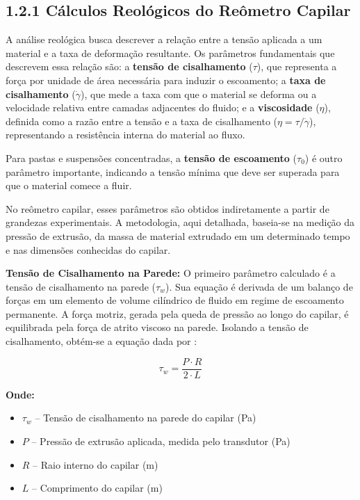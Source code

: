 \documentclass[a4paper,12pt]{article}
\begin{document}
\subsection*{1.2.1 Cálculos Reológicos do Reômetro Capilar}
A análise reológica busca descrever a relação entre a tensão aplicada a um material e a taxa de deformação resultante. Os parâmetros fundamentais que descrevem essa relação são: a \textbf{tensão de cisalhamento} ($\tau$), que representa a força por unidade de área necessária para induzir o escoamento; a \textbf{taxa de cisalhamento} ($\dot{\gamma}$), que mede a taxa com que o material se deforma ou a velocidade relativa entre camadas adjacentes do fluido; e a \textbf{viscosidade} ($\eta$), definida como a razão entre a tensão e a taxa de cisalhamento ($\eta = \tau / \dot{\gamma}$), representando a resistência interna do material ao fluxo.

Para pastas e suspensões concentradas, a \textbf{tensão de escoamento} ($\tau_0$) é outro parâmetro importante, indicando a tensão mínima que deve ser superada para que o material comece a fluir.

No reômetro capilar, esses parâmetros são obtidos indiretamente a partir de gran\-de\-zas experimentais. A metodologia, aqui detalhada, baseia-se na medição da pressão de extrusão, da massa de material extrudado em um determinado tempo e nas dimensões conhecidas do capilar.

\textbf{Tensão de Cisalhamento na Parede:} O primeiro parâmetro calculado é a tensão de cisalhamento na parede ($\tau_w$). Sua equação é derivada de um balanço de forças em um elemento de volume cilíndrico de fluido em regime de escoamento permanente. A força motriz, gerada pela queda de pressão ao longo do capilar, é equilibrada pela força de atrito viscoso na parede. Isolando a tensão de cisalhamento, obtém-se a equação dada por \cite{barnes1989}:

\begin{equation}
    \tau_w = \frac{P \cdot R}{2 \cdot L}
\end{equation}

\textbf{Onde:}
\begin{itemize}[leftmargin=1.5em]
  \item $\tau_w$ -- Tensão de cisalhamento na parede do capilar (\si{Pa})
  \item $P$ -- Pressão de extrusão aplicada, medida pelo transdutor (\si{Pa})
  \item $R$ -- Raio interno do capilar (\si{m})
  \item $L$ -- Comprimento do capilar (\si{m})
\end{itemize}
\end{document}
